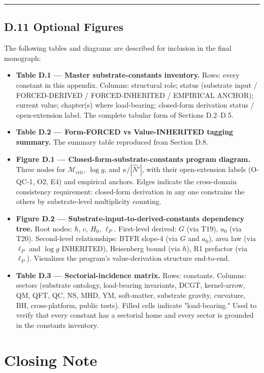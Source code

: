 \documentclass[11pt]{book}
\begin{document}
\bigskip\hrule\bigskip

\section{D.11 Optional Figures}

The following tables and diagrams are described for inclusion in the final monograph:

\begin{itemize}
\item \textbf{Table D.1 — Master substrate-constants inventory.} Rows: every constant in this appendix. Columns: structural role; status (substrate input / FORCED-DERIVED / FORCED-INHERITED / EMPIRICAL ANCHOR); current value; chapter(s) where load-bearing; closed-form derivation status / open-extension label. The complete tabular form of Sections D.2–D.5.
\item \textbf{Table D.2 — Form-FORCED vs Value-INHERITED tagging summary.} The summary table reproduced from Section D.8.
\item \textbf{Figure D.1 — Closed-form-substrate-constants program diagram.} Three nodes for $\mathcal{M}_\mathrm{crit}$, $\log g$, and $\kappa/|\hat{N}'|$, with their open-extension labels (O-QC-1, O2, E4) and empirical anchors. Edges indicate the cross-domain consistency requirement: closed-form derivation in any one constrains the others by substrate-level multiplicity counting.
\item \textbf{Figure D.2 — Substrate-input-to-derived-constants dependency tree.} Root nodes: $\hbar$, $c$, $H_0$, $\ell_P$. First-level derived: $G$ (via T19), $a_0$ (via T20). Second-level relationships: BTFR slope-4 (via $G$ and $a_0$), area law (via $\ell_P$ and $\log g$ INHERITED), Heisenberg bound (via $\hbar$), R1 prefactor (via $\ell_P$). Visualizes the program's value-derivation structure end-to-end.
\item \textbf{Table D.3 — Sectorial-incidence matrix.} Rows: constants. Columns: sectors (substrate ontology, load-bearing invariants, DCGT, kernel-arrow, QM, QFT, QC, NS, MHD, YM, soft-matter, substrate gravity, curvature, BH, cross-platform, public tests). Filled cells indicate "load-bearing." Used to verify that every constant has a sectorial home and every sector is grounded in the constants inventory.
\end{itemize}

\newpage

\chapter*{Closing Note}
\end{document}
